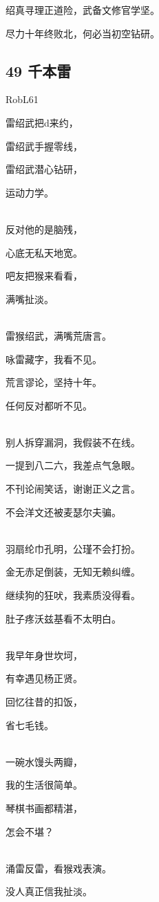 绍真寻理正道险，武备文修官学坚。

尽力十年终败北，何必当初空钻研。

\hypertarget{ux5343ux672cux96f7}{%
\subsection{49 千本雷}\label{ux5343ux672cux96f7}}

RobL61

雷绍武把d来约，

雷绍武手握零线，

雷绍武潜心钻研，

运动力学。

~\\
反对他的是脑残，

心底无私天地宽。

吧友把猴来看看，

满嘴扯淡。

~\\
雷猴绍武，满嘴荒唐言。

咏雷藏字，我看不见。

荒言谬论，坚持十年。

任何反对都听不见。

~\\
别人拆穿漏洞，我假装不在线。

一提到八二六，我差点气急眼。

不刊论闹笑话，谢谢正义之言。

不会洋文还被麦瑟尔夫骗。

~\\
羽扇纶巾孔明，公瑾不会打扮。

金无赤足倒装，无知无赖纠缠。

继续狗的狂吠，我素质没得看。

肚子疼沃兹基看不太明白。

~\\
我早年身世坎坷，

有幸遇见杨正贤。

回忆往昔的扣饭，

省七毛钱。

~\\
一碗水馒头两瓣，

我的生活很简单。

琴棋书画都精湛，

怎会不堪？

~\\
涌雷反雷，看猴戏表演。

没人真正信我扯淡。


